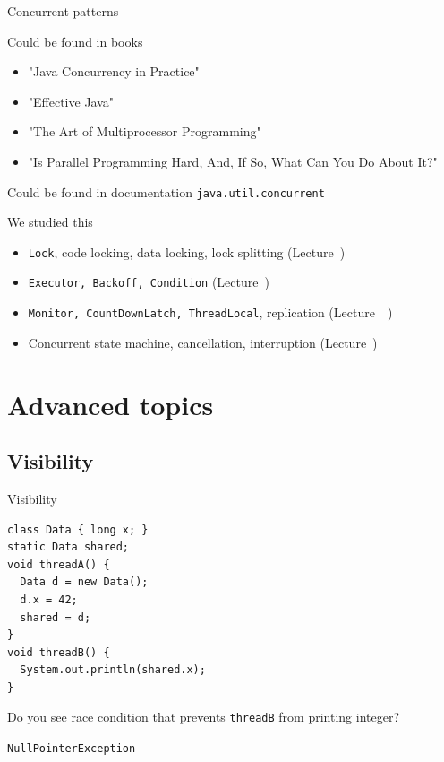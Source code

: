 \begin{frame}{Concurrent patterns}

Could be found in books
\begin{itemize}
  \item "Java Concurrency in Practice"
  \item "Effective Java"
  \item "The Art of Multiprocessor Programming"
  \item "Is Parallel Programming Hard, And, If So, What Can You Do About It?"
\end{itemize}

Could be found in documentation \texttt{java.util.concurrent}

We studied this
\begin{itemize}
  \item \texttt{Lock}, code locking, data locking, lock splitting (Lecture~\basicNum)
  \item \texttt{Executor, Backoff, Condition} (Lecture~\basicTwoNum)
  \item \texttt{Monitor, CountDownLatch, ThreadLocal}, replication (Lecture~~\syncPrimitivesNum)
  \item Concurrent state machine, cancellation, interruption (Lecture~\patternsNum)
\end{itemize}

\end{frame}


\section{Advanced topics}

\subsection{Visibility}
\showTOCSub

\begin{frame}[t,fragile]{Visibility}

\begin{verbatim}
class Data { long x; }
static Data shared;
void threadA() {
  Data d = new Data();
  d.x = 42;
  shared = d;
}
void threadB() {
  System.out.println(shared.x);
}
\end{verbatim}

\pause

Do you see race condition that prevents \texttt{threadB} from printing integer?

\pause

\texttt{NullPointerException}

\end{frame}


